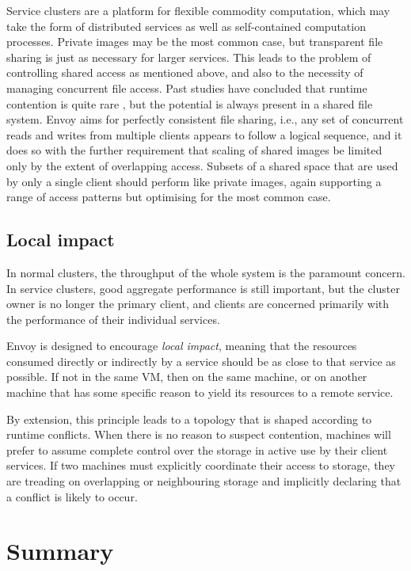 Service clusters are a platform for flexible commodity computation, which may take the form of distributed services as well as self-contained computation processes. Private images may be the most common case, but transparent file sharing is just as necessary for larger services. This leads to the problem of controlling shared access as mentioned above, and also to the necessity of managing concurrent file access. Past studies have concluded that runtime contention is quite rare \cite{kistler,welch}, but the potential is always present in a shared file system. Envoy aims for perfectly consistent file sharing, i.e., any set of concurrent reads and writes from multiple clients appears to follow a logical sequence, and it does so with the further requirement that scaling of shared images be limited only by the extent of overlapping access. Subsets of a shared space that are used by only a single client should perform like private images, again supporting a range of access patterns but optimising for the most common case.

\subsection{Local impact}

In normal clusters, the throughput of the whole system is the paramount concern. In service clusters, good aggregate performance is still important, but the cluster owner is no longer the primary client, and clients are concerned primarily with the performance of their individual services.

Envoy is designed to encourage \emph{local impact}, meaning that the resources consumed directly or indirectly by a service should be as close to that service as possible. If not in the same VM, then on the same machine, or on another machine that has some specific reason to yield its resources to a remote service.

By extension, this principle leads to a topology that is shaped according to runtime conflicts. When there is no reason to suspect contention, machines will prefer to assume complete control over the storage in active use by their client services. If two machines must explicitly coordinate their access to storage, they are treading on overlapping or neighbouring storage and implicitly declaring that a conflict is likely to occur.

\section{Summary}


